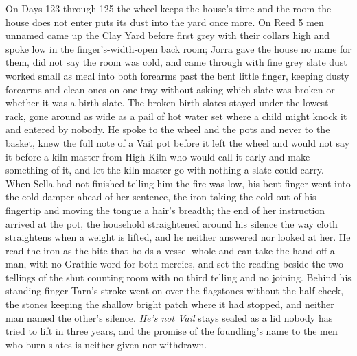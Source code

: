 \documentclass{design/chronicle}
\begin{document}
{On Days 123 through 125 the wheel keeps the house’s time and the room the house does not enter puts its dust into the yard once more. On Reed 5 men unnamed came up the Clay Yard before first grey with their collars high and spoke low in the finger’s-width-open back room; Jorra gave the house no name for them, did not say the room was cold, and came through with fine grey slate dust worked small as meal into both forearms past the bent little finger, keeping dusty forearms and clean ones on one tray without asking which slate was broken or whether it was a birth-slate. The broken birth-slates stayed under the lowest rack, gone around as wide as a pail of hot water set where a child might knock it and entered by nobody. He spoke to the wheel and the pots and never to the basket, knew the full note of a Vail pot before it left the wheel and would not say it before a kiln-master from High Kiln who would call it early and make something of it, and let the kiln-master go with nothing a slate could carry. When Sella had not finished telling him the fire was low, his bent finger went into the cold damper ahead of her sentence, the iron taking the cold out of his fingertip and moving the tongue a hair’s breadth; the end of her instruction arrived at the pot, the household straightened around his silence the way cloth straightens when a weight is lifted, and he neither answered nor looked at her. He read the iron as the bite that holds a vessel whole and can take the hand off a man, with no Grathic word for both mercies, and set the reading beside the two tellings of the shut counting room with no third telling and no joining. Behind his standing finger Tarn’s stroke went on over the flagstones without the half-check, the stones keeping the shallow bright patch where it had stopped, and neither man named the other’s silence. \emph{He’s not Vail} stays sealed as a lid nobody has tried to lift in three years, and the promise of the foundling’s name to the men who burn slates is neither given nor withdrawn.

}
\end{document}
